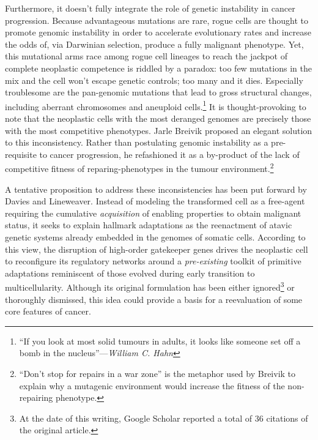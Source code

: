 Furthermore, it doesn't fully integrate the role of genetic instability
in cancer progression.  Because advantageous mutations are rare, rogue
cells are thought to promote genomic instability in order to
accelerate evolutionary rates and increase the odds of, via Darwinian
selection, produce a fully malignant
phenotype.\cite{sieber_genomic_2003} Yet, this mutational arms race
among rogue cell lineages to reach the jackpot of complete neoplastic
competence is riddled by a paradox: too few mutations in the mix and
the cell won't escape genetic controls; too many and it dies.
Especially troublesome are the \mbox{pan-genomic} mutations that lead
to gross structural changes, including aberrant chromosomes and
aneuploid cells.\footnote{``If you look at most solid tumours in
  adults, it looks like someone set off a bomb in the
  nucleus''---\emph{William C. Hahn}} It is thought-provoking to note
that the neoplastic cells with the most deranged genomes are precisely
those with the most competitive phenotypes.  Jarle Breivik proposed an
elegant solution to this
inconsistency.\cite{breivik_evolutionary_2005} Rather than postulating
genomic instability as a pre-requisite to cancer progression, he
refashioned it as a \mbox{by-product} of the lack of competitive
fitness of reparing-phenotypes in the tumour
environment.\footnote{``Don't stop for repairs in a war zone'' is the
  metaphor used by Breivik to explain why a mutagenic environment
  would increase the fitness of the non-repairing
  phenotype.  %
}

A tentative proposition to address these inconsistencies has been put forward by
Davies and Lineweaver.\cite{davies_cancer_2011} Instead of modeling the
transformed cell as a free-agent requiring the cumulative \emph{acquisition} of
enabling properties to obtain malignant status, it seeks to explain hallmark
adaptations as the reenactment of atavic genetic systems already embedded in the
genomes of somatic cells.  According to this view, the disruption of high-order
gatekeeper genes drives the neoplastic cell to reconfigure its regulatory
networks around a \emph{pre-existing} toolkit of primitive adaptations
reminiscent of those evolved during early transition to multicellularity.
Although its original formulation has been either ignored\footnote{At the date
  of this writing, Google Scholar reported a total of 36 citations of the
  original article.} or thoroughly
dismissed,\cite{pettit_cancer_2012,myers_aaargh!_2012} this idea could provide a
basis for a reevaluation of some core features of cancer.

